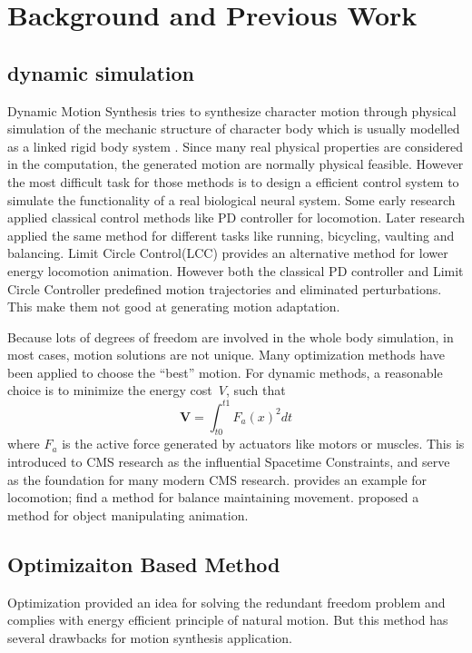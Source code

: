 \section{Background and Previous Work}
\subsection{dynamic simulation}
Dynamic Motion Synthesis  tries to synthesize character motion through physical simulation of the mechanic structure of character body which is usually modelled as a linked rigid body system \cite{Baraff1994,Mirtich1996,Stewart2000}. 
Since many real physical properties are considered in the computation, the generated motion are normally physical feasible. 
However the most difficult task for those methods is to design a efficient control system to simulate the functionality of a real biological neural system. Some early research applied classical control methods like PD controller \cite{Raibert1991} for locomotion. 
Later research \cite{Hodgins1995} applied the same method for different tasks like running, bicycling, vaulting and balancing. 
Limit Circle Control(LCC) \cite{Laszlo1996} provides an alternative method for lower energy locomotion animation. 
However both the classical PD controller and Limit Circle Controller predefined motion trajectories and eliminated perturbations. 
This make them not good at generating motion adaptation.

Because lots of degrees of freedom are involved in the whole body simulation, in most cases, motion solutions are not unique.
Many optimization methods have been applied to choose the ``best'' motion. For dynamic methods, a reasonable choice is to minimize the energy cost~$V$, such that 
\[
\textbf{V}=\int_{t0}^{t1}F_{a}(x)^2dt
\]
where $F_{a}$ is the active force generated by actuators like motors or muscles. 
This is introduced to CMS research as the influential Spacetime Constraints\cite{Witkin1988}, and serve as the foundation for many modern CMS research. \cite{Jain2009} provides an example for locomotion;  \cite{BalanceControl} find a method for balance maintaining movement. \cite{Liu2009} proposed a method for object manipulating animation.

\subsection{Optimizaiton Based Method}
Optimization provided an idea for solving the redundant freedom problem and complies with energy efficient principle of natural motion.  
But this method has several drawbacks for motion synthesis application.

